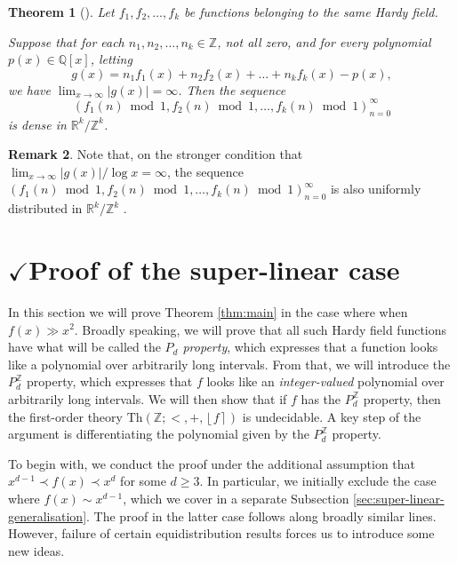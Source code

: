 \documentclass{amsart}
\newtheorem{theorem}{Theorem}[section]
\theoremstyle{definition}
\newtheorem{remark}[theorem]{Remark}
\newcommand{\nint}[1]{\left\lfloor #1 \right\rceil}
\newcommand{\bra}[1]{\left( #1 \right)}
\newcommand{\abs}[1]{\left|#1\right|}
\newcommand{\QQ}{\mathbb{Q}}
\newcommand{\ZZ}{\mathbb{Z}}
\newcommand{\RR}{\mathbb{R}}
\newcommand{\theory}[1]{\mathrm{Th}(#1)}
\begin{document}
\begin{theorem}[{\cite[Thm.\ 1.9]{Boshernitzan-1994}}]\label{thm:hardy:equidist}
Let $f_1,f_2,\dots,f_k$ be functions belonging to the same Hardy field. 

Suppose that for each $n_1,n_2,\dots,n_k \in \ZZ$, not all zero, and for every polynomial $p(x) \in \QQ[x]$, letting 
\[
g(x) = n_1 f_1(x) + n_2 f_2(x) + \dots + n_k f_k(x) - p(x),\]
we have
$\lim_{x \to \infty} {\abs{g(x)}}= \infty$. Then the sequence 
\[
\bra{f_1(n) \bmod 1,f_2(n) \bmod 1,\dots, f_k(n) \bmod 1}_{n=0}^\infty\]
is dense in $\RR^k/\ZZ^k$.
\end{theorem}
\begin{remark}
Note that, on the stronger condition that $\lim_{x \to \infty} \abs{g(x)}/\log x = \infty$, the sequence $\bra{f_1(n) \bmod 1,f_2(n) \bmod 1,\dots, f_k(n) \bmod 1}_{n=0}^\infty$ is also uniformly distributed in $\RR^k/\ZZ^k$ \cite[Thm.\ 1.8]{Boshernitzan-1994}.
\end{remark}


 


\section{$\checkmark$Proof of the super-linear case}
In this section we will prove Theorem \ref{thm:main} in the case where when $f(x) \gg x^2$. Broadly speaking, we will prove that all such Hardy field functions have what will be called the \emph{$P_d$ property}, which expresses that a function looks like a polynomial over arbitrarily long intervals. From that, we will introduce the $P_d^{\ZZ}$ property, which expresses that $f$ looks like an \emph{integer-valued} polynomial over arbitrarily long intervals. We will then show that if $f$ has the $P_d^{\ZZ}$ property, then the first-order theory $\theory{\ZZ; <, +, \nint{f}}$ is undecidable. A key step of the argument is differentiating the polynomial given by the $P_d^{\ZZ}$ property. 

To begin with, we conduct the proof under the additional assumption that $x^{d-1} \prec f(x) \prec x^{d}$ for some $d \geq 3$. In particular, we initially exclude the case where $f(x) \sim x^{d-1}$, which we cover in a separate Subsection \ref{sec:super-linear-generalisation}. The proof in the latter case follows along broadly similar lines. However, failure of certain equidistribution results forces us to introduce some new ideas.
\end{document}
